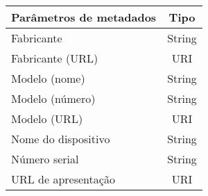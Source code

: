 \begin{tabular}{lc}
  \toprule
  Parâmetros de metadados & Tipo   \\
  \midrule
  Fabricante              & String \\
  Fabricante (URL)        & URI    \\
  Modelo (nome)           & String \\
  Modelo (número)         & String \\
  Modelo (URL)            & URI    \\
  Nome do dispositivo     & String \\
  Número serial           & String \\
  URL de apresentação     & URI    \\
  \bottomrule
\end{tabular}
